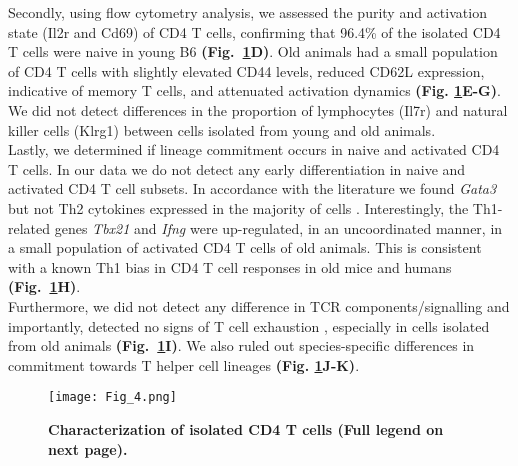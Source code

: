 Secondly, using flow cytometry analysis, we assessed the purity and activation state (Il2r\textalpha{} and Cd69) of CD4\plus{} T cells, confirming that 96.4\% of the isolated CD4\plus{} T cells were naive in young B6 \textbf{(Fig.~\ref{fig1:characterization}D)}. Old animals had a small population of CD4\plus{} T cells with slightly elevated CD44 levels, reduced CD62L expression, indicative of memory T cells, and attenuated activation dynamics \textbf{(Fig. \ref{fig1:characterization}E-G)}. We did not detect differences in the proportion of lymphocytes (Il7r) and natural killer cells (Klrg1) between cells isolated from young and old animals. \\

Lastly, we determined if lineage commitment occurs in naive and activated CD4\plus{} T cells. In our data we do not detect any early differentiation in naive and activated CD4\plus{} T cell subsets. In accordance with the literature we found \textit{Gata3} but not Th2 cytokines expressed in the majority of cells  \citep{Ho2009}. Interestingly, the Th1-related genes \textit{Tbx21} and \textit{Ifng} were up-regulated, in an uncoordinated manner, in a small population of activated CD4\plus{} T cells of old animals. This is consistent with a known Th1 bias in CD4\plus{} T cell responses in old mice \citep{Zhang2014} and humans \citep{Sakata-Kaneko2000} \textbf{(Fig.~\ref{fig1:characterization}H)}. \\

Furthermore, we did not detect any difference in TCR components/signalling and importantly, detected no signs of T cell exhaustion \citep{Wherry2011}, especially in cells isolated from old animals \textbf{(Fig.~\ref{fig1:characterization}I)}. We also ruled out species-specific differences in commitment towards T helper cell lineages \textbf{(Fig. \ref{fig1:characterization}J-K)}. 

\newpage

\begin{figure}[!hb]
\centering
\texttt{[image: Fig\_4.png]}
\caption[Characterization of isolated CD4\plus{} T cells]{\textbf{Characterization of isolated CD4\plus{} T cells (Full legend on next page).}}
\label{fig1:characterization}
\end{figure}

